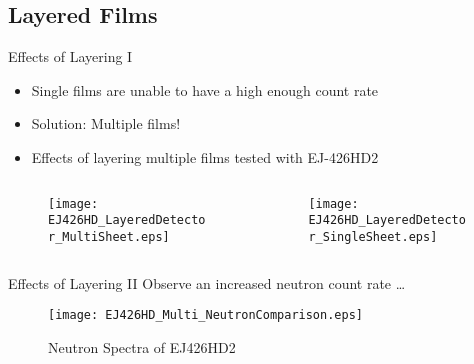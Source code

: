 \subsection{Layered Films}
\begin{frame}{Effects of Layering I}
\small
\begin{itemize}
	\item Single films are unable to have a high enough count rate
	\item Solution: Multiple films!
	\item Effects of layering multiple films tested with EJ-426HD2
\end{itemize}
\begin{columns}[onlytextwidth]
\begin{column}{0.45\textwidth}
	\tiny
	\begin{figure}
		\centering
		\texttt{[image: EJ426HD\_LayeredDetector\_MultiSheet.eps]}
	\end{figure}
\end{column}
\begin{column}{0.45\textwidth}
	\tiny
	\begin{figure}
		\centering
		\texttt{[image: EJ426HD\_LayeredDetector\_SingleSheet.eps]}
	\end{figure}
\end{column}
\end{columns}
\end{frame}
\begin{frame}{Effects of Layering II}
Observe an increased neutron count rate \dots
	\begin{figure}
		\centering
		\texttt{[image: EJ426HD\_Multi\_NeutronComparison.eps]}
		\small \caption{Neutron Spectra of EJ426HD2}
	\end{figure}
\end{frame}
